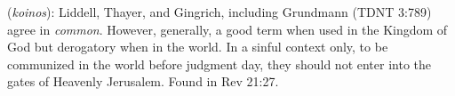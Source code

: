 \item[Common,]

(\textit{koinos}):
Liddell, Thayer, and Gingrich, including Grundmann (TDNT 3:789) agree in \emph{common}. However, generally, a good term when used in the Kingdom of God but derogatory when in the world. In a sinful context only, to be communized in the world before judgment day, they should not enter into the gates of Heavenly Jerusalem.
Found in Rev 21:27.
